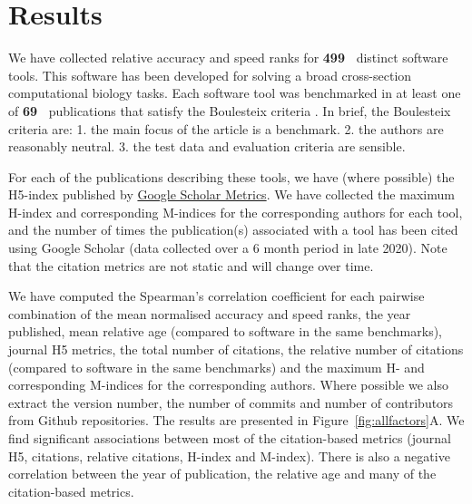 \documentclass[fleqn,10pt]{SelfArx} %
\def\numTools{499}
\def\numBenchmarkPubs{69}
\begin{document}
\section*{Results}
We have collected relative accuracy and speed ranks for
\textbf{{\color{red}\numTools~}} distinct software tools. This software has
been developed for solving a broad cross-section computational biology
tasks.
Each
software tool was benchmarked in at least one of
\textbf{{\color{red}\numBenchmarkPubs~}} publications that satisfy the Boulesteix
criteria \cite{Boulesteix2013-vb}. In brief, the Boulesteix criteria
are: 1. the main focus of the article is a benchmark. 2. the authors
are reasonably neutral. 3. the test data and evaluation criteria are
sensible.

For each of the publications describing these tools, we have (where
possible) the H5-index published by
\href{https://scholar.google.co.nz/citations?view\_op=top\_venues\&hl=en}{Google
  Scholar Metrics}. We have collected the maximum H-index and
corresponding M-indices \cite{Hirsch2005-mt} for the corresponding
authors for each tool, and the number of times the publication(s)
associated with a tool has been cited using Google Scholar (data
collected over a 6 month period in late 2020). Note that the citation metrics
are not static and will change over time. 

We have computed the Spearman’s correlation coefficient for each
pairwise combination of the mean normalised accuracy and speed ranks,
the year published, mean relative age (compared to software in the
same benchmarks), journal H5 metrics, the total number of citations,
the relative number of citations (compared to software in the same
benchmarks) and the maximum H- and corresponding M-indices for the corresponding
authors. Where possible we also extract the version number, the number
of commits and number of contributors from Github repositories.  The
results are presented in Figure~\ref{fig:allfactors}A. We find
significant associations between most of the citation-based metrics
(journal H5, citations, relative citations, H-index and
M-index). There is also a negative correlation between the year of
publication, the relative age and many of the citation-based metrics.
\end{document}
